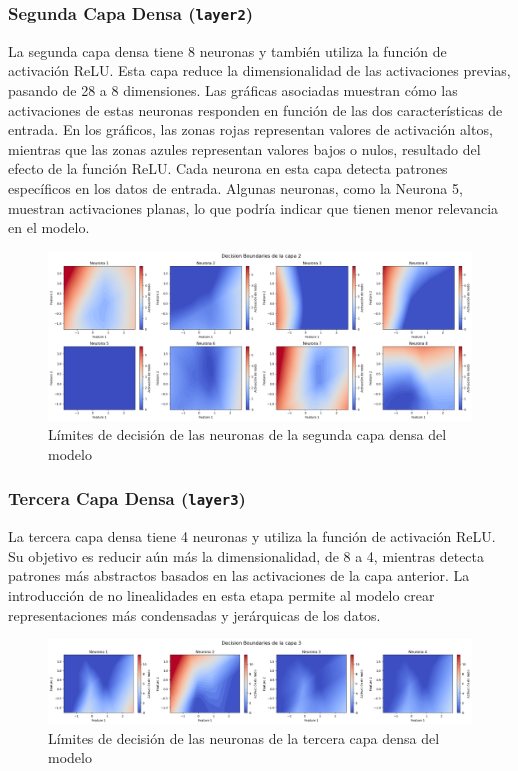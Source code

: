 \documentclass[paper=a4, fontsize=11pt]{scrartcl} %
\numberwithin{equation}{section} %
\numberwithin{figure}{section} %
\numberwithin{table}{section} %
\begin{document}
\subsubsection{Segunda Capa Densa (\texttt{layer2})}
La segunda capa densa tiene 8 neuronas y también utiliza la función de activación ReLU. Esta capa reduce la dimensionalidad de las activaciones previas, pasando de 28 a 8 dimensiones. Las gráficas asociadas muestran cómo las activaciones de estas neuronas responden en función de las dos características de entrada. En los gráficos, las zonas rojas representan valores de activación altos, mientras que las zonas azules representan valores bajos o nulos, resultado del efecto de la función ReLU. Cada neurona en esta capa detecta patrones específicos en los datos de entrada. Algunas neuronas, como la Neurona 5, muestran activaciones planas, lo que podría indicar que tienen menor relevancia en el modelo.

\begin{figure}[H]
  \centering
  \includegraphics[width=.9\linewidth]{images/plot_neuronas_L2.png}
  \caption{Límites de decisión de las neuronas de la segunda capa densa del modelo}
  \label{fig:sub1}
\end{figure}

\subsubsection{Tercera Capa Densa (\texttt{layer3})}
La tercera capa densa tiene 4 neuronas y utiliza la función de activación ReLU. Su objetivo es reducir aún más la dimensionalidad, de 8 a 4, mientras detecta patrones más abstractos basados en las activaciones de la capa anterior. La introducción de no linealidades en esta etapa permite al modelo crear representaciones más condensadas y jerárquicas de los datos.

\begin{figure}[H]
  \centering
  \includegraphics[width=1\linewidth]{images/plot_neuronas_L3.png}
  \caption{Límites de decisión de las neuronas de la tercera capa densa del modelo}
  \label{fig:sub1}
\end{figure}
\end{document}
